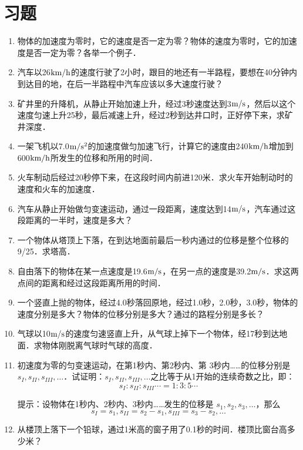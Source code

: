 \section*{习题}
\begin{enumerate}
	\item 物体的加速度为零时，它的速度是否一定为零？物体的速度为零时，它的加速度是否一定为零？各举一个例子．
	\item 汽车以26$\text{km}/\text{h}$的速度行驶了2小时，跟目的地还有一半路程，要想在40分钟内到达目的地，在后一半路程中汽车应该以多大速度行驶？
	\item 矿井里的升降机，从静止开始加速上升，经过3秒速度达到3$\text{m}/\text{s}$，然后以这个速度匀速上升25秒，最后减速上升，经过2秒到达井口时，正好停下来，求矿井深度．
	\item 一架飞机以7.0$\text{m}/\text{s}^2$的加速度做匀加速飞行，计算它的速度由240$\text{km}/\text{h}$增加到600$\text{km}/\text{h}$所发生的位移和所用的时间．
	\item 火车制动后经过20秒停下来，在这段时间内前进120米．求火车开始制动时的速度和火车的加速度．
	\item 汽车从静止开始做匀变速运动，通过一段距离，速度达到14$\text{m}/\text{s}$，汽车通过这段距离的一半时，速度是多大？
	\item 一个物体从塔顶上下落，在到达地面前最后一秒内通过的位移是整个位移的9/25．求塔高．
	\item 自由落下的物体在某一点速度是19.6$\text{m}/\text{s}$，在另一点的速度是39.2$\text{m}/\text{s}$．求这两点间的距离和经过这段距离所用的时间．
	\item 一个竖直上抛的物体，经过4.0秒落回原地，经过1.0秒，2.0秒，3.0秒，物体的速度分别是多大？物体的位移分别是多大？通过的路程分别是多长？
	\item 气球以10$\text{m}/\text{s}$的速度匀速竖直上升，从气球上掉下一个物体，经17秒到达地面．求物体刚脱离气球时气球的高度．
	\item 初速度为零的匀变速运动，在第1秒内、第2秒内、第
	3秒内……的位移分别是$s_I,s_{II},s_{III},\ldots$．试证明：$s_I,s_{II},s_{III},\ldots$之比等于从1开始的连续奇数之比，即：
$$s_I:s_{II}:s_{III}\cdots=1:3:5\cdots$$

提示：设物体在1秒内、2秒内、3秒内……发生的位移是
$s_1,s_2,s_3,\ldots$，那么
$$s_I=s_1, s_{II}=s_2-s_1, s_{III}=s_3-s_2,\ldots$$
	\item 从楼顶上落下一个铅球，通过1米高的窗子用了0.1秒的时间．楼顶比窗台高多少米？
\end{enumerate}





